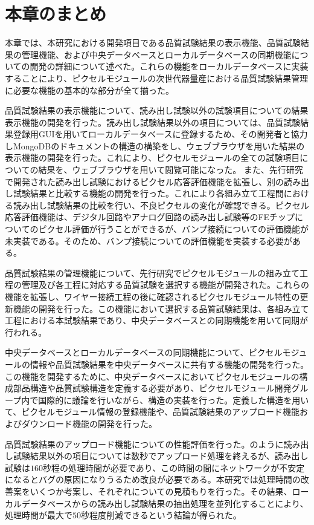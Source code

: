 \section{本章のまとめ}
\label{sec:summary7}

本章では、本研究における開発項目である品質試験結果の表示機能、品質試験結果の管理機能、および中央データベースとローカルデータベースの同期機能についての開発の詳細について述べた。これらの機能をローカルデータベースに実装することにより、ピクセルモジュールの次世代器量産における品質試験結果管理に必要な機能の基本的な部分が全て揃った。

品質試験結果の表示機能について、読み出し試験以外の試験項目についての結果表示機能の開発を行った。読み出し試験結果以外の項目については、品質試験結果登録用GUIを用いてローカルデータベースに登録するため、その開発者と協力しMongoDBのドキュメントの構造の構築をし、ウェブブラウザを用いた結果の表示機能の開発を行った。これにより、ピクセルモジュールの全ての試験項目についての結果を、ウェブブラウザを用いて閲覧可能になった。
また、先行研究で開発された読み出し試験におけるピクセル応答評価機能を拡張し、別の読み出し試験結果と比較する機能の開発を行った。これにより各組み立て工程間における読み出し試験結果の比較を行い、不良ピクセルの変化が確認できる。ピクセル応答評価機能は、デジタル回路やアナログ回路の読み出し試験等のFEチップについてのピクセル評価が行うことができるが、バンプ接続についての評価機能が未実装である。そのため、バンプ接続についての評価機能を実装する必要がある。

品質試験結果の管理機能について、先行研究でピクセルモジュールの組み立て工程の管理及び各工程に対応する品質試験を選択する機能が開発された。これらの機能を拡張し、ワイヤー接続工程の後に確認されるピクセルモジュール特性の更新機能の開発を行った。この機能において選択する品質試験結果は、各組み立て工程における本試験結果であり、中央データベースとの同期機能を用いて同期が行われる。

中央データベースとローカルデータベースの同期機能について、ピクセルモジュールの情報や品質試験結果を中央データベースに共有する機能の開発を行った。この機能を開発するために、中央データベースにおいてピクセルモジュールの構成部品構造や品質試験構造を定義する必要があり、ピクセルモジュール開発グループ内で国際的に議論を行いながら、構造の実装を行った。定義した構造を用いて、ピクセルモジュール情報の登録機能や、品質試験結果のアップロード機能およびダウンロード機能の開発を行った。

品質試験結果のアップロード機能についての性能評価を行った。のように読み出し試験結果以外の項目については数秒でアップロード処理を終えるが、読み出し試験は$160$秒程の処理時間が必要であり、この時間の間にネットワークが不安定になるとバグの原因になりうるため改良が必要である。本研究では処理時間の改善案をいくつか考案し、それぞれについての見積もりを行った。その結果、ローカルデータベースからの読み出し試験結果の抽出処理を並列化することにより、処理時間が最大で$50$秒程度削減できるという結論が得られた。





\newpage
